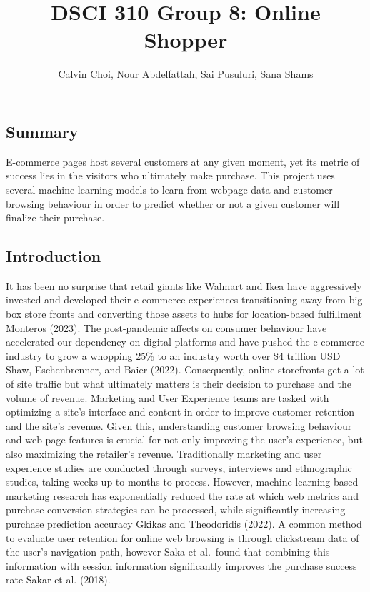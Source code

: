 \documentclass[
  letterpaper,
  DIV=11,
  numbers=noendperiod]{scrartcl}
\title{DSCI 310 Group 8: Online Shopper}
\author{Calvin Choi, Nour Abdelfattah, Sai Pusuluri, Sana Shams}
\date{}
\renewcommand*\contentsname{Table of contents}
\newcommand\contentsname{Table of contents}
\begin{document}
\maketitle

\renewcommand*\contentsname{Table of contents}
{
\hypersetup{linkcolor=}
\setcounter{tocdepth}{2}
\tableofcontents
}
\subsection{Summary}\label{summary}

E-commerce pages host several customers at any given moment, yet its
metric of success lies in the visitors who ultimately make purchase.
This project uses several machine learning models to learn from webpage
data and customer browsing behaviour in order to predict whether or not
a given customer will finalize their purchase.

\subsection{Introduction}\label{introduction}

It has been no surprise that retail giants like Walmart and Ikea have
aggressively invested and developed their e-commerce experiences
transitioning away from big box store fronts and converting those assets
to hubs for location-based fulfillment Monteros (2023). The
post-pandemic affects on consumer behaviour have accelerated our
dependency on digital platforms and have pushed the e-commerce industry
to grow a whopping 25\% to an industry worth over \$4 trillion USD Shaw,
Eschenbrenner, and Baier (2022). Consequently, online storefronts get a
lot of site traffic but what ultimately matters is their decision to
purchase and the volume of revenue. Marketing and User Experience teams
are tasked with optimizing a site's interface and content in order to
improve customer retention and the site's revenue. Given this,
understanding customer browsing behaviour and web page features is
crucial for not only improving the user's experience, but also
maximizing the retailer's revenue. Traditionally marketing and user
experience studies are conducted through surveys, interviews and
ethnographic studies, taking weeks up to months to process. However,
machine learning-based marketing research has exponentially reduced the
rate at which web metrics and purchase conversion strategies can be
processed, while significantly increasing purchase prediction accuracy
Gkikas and Theodoridis (2022). A common method to evaluate user
retention for online web browsing is through clickstream data of the
user's navigation path, however Saka et al.~found that combining this
information with session information significantly improves the purchase
success rate Sakar et al. (2018).
\end{document}
